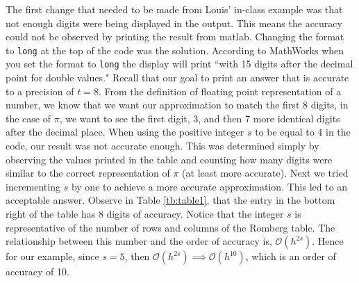\documentclass{article}
\begin{document}
\begin{enumerate}[label = {\arabic*}]
		\hspace{15pt} The first change that needed to be made from Louis' in-class example was that not enough digits were being displayed in the output. This means the accuracy could not be observed by printing the result from matlab. Changing the format to \texttt{long} at the top of the code was the solution. According to MathWorks when you set the format to \texttt{long} the display will print ``with 15 digits after the decimal point for double values." Recall that our goal to print an answer that is accurate to a precision of $t = 8$. From the definition of floating point representation of a number, we know that we want our approximation to match the first 8 digits, in the case of $\pi$, we want to see the first digit, 3, and then 7 more identical digits after the decimal place. When using the positive integer $s$ to be equal to 4 in the code, our result was not accurate enough. This was determined simply by observing the values printed in the table and counting how many digits were similar to the correct representation of $\pi$ (at least more accurate). Next we tried incrementing $s$ by one to achieve a more accurate approximation. This led to an acceptable answer. Observe in Table \ref{tb:table1}, that the entry in the bottom right of the table has 8 digits of accuracy. Notice that the integer $s$ is representative of the number of rows and columns of the Romberg table. The relationship between this number and the order of accuracy is, $\mathcal{O}(h^{2s})$. Hence for our example, since $s = 5$, then $\mathcal{O}(h^{2s}) \implies \mathcal{O}(h^{10})$, which is an order of accuracy of 10.
	\end{enumerate}
\end{document}
